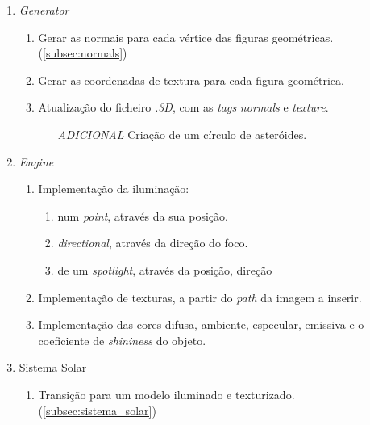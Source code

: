 \documentclass[runningheads]{llncs}
\begin{document}
    \begin{enumerate}
        \item \textit{Generator}
        \begin{enumerate}
            \item Gerar as normais para cada vértice das figuras geométricas. (\ref{subsec:normals})
            \item Gerar as coordenadas de textura para cada figura geométrica.
            \item Atualização do ficheiro \textit{.3D}, com as \textit{tags} 
                  \textit{normals} e \textit{texture}.
            \begin{enumerate}
                \item[\textit{ADICIONAL}]{Criação de um círculo de asteróides.}
            \end{enumerate}
        \end{enumerate}
        \item \textit{Engine}
        \begin{enumerate}
            \item Implementação da iluminação:
            \begin{enumerate}
                \item num \textit{point}, através da sua posição.
                \item \textit{directional}, através da direção do foco.
                \item de um \textit{spotlight}, através da posição, direção 
            \end{enumerate}
            \item Implementação de texturas, a partir do \textit{path} da imagem a inserir.
            \item Implementação das cores difusa, ambiente, especular, emissiva e o coeficiente
                  de \textit{shininess} do objeto.
        \end{enumerate}
        \item Sistema Solar 
        \begin{enumerate}
            \item Transição para um modelo iluminado e texturizado.(\ref{subsec:sistema_solar})
        \end{enumerate}
    \end{enumerate}
    
    
    
    
    

    
\end{document}
